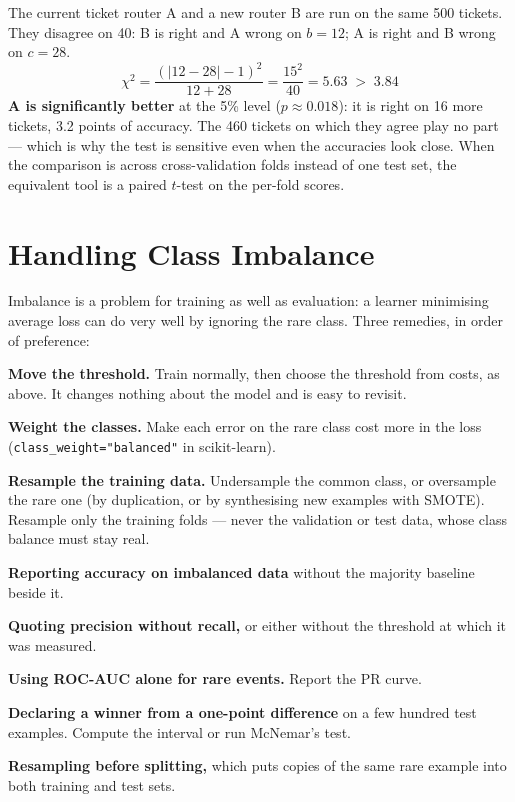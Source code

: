 \begin{worked}
The current ticket router A and a new router B are run on the same 500 tickets.
They disagree on 40: B is right and A wrong on $b = 12$; A is right and B wrong on
$c = 28$.
\[
\chi^2 = \frac{(|12 - 28| - 1)^2}{12 + 28} = \frac{15^2}{40} = 5.63 \;>\; 3.84
\]
\textbf{A is significantly better} at the 5\% level ($p \approx 0.018$): it is right on
16 more tickets, 3.2 points of accuracy. The 460 tickets on which they agree play
no part --- which is why the test is sensitive even when the accuracies look
close. When the comparison is across cross-validation folds instead of one test
set, the equivalent tool is a paired $t$-test on the per-fold scores.
\end{worked}

\section{Handling Class Imbalance}

Imbalance is a problem for training as well as evaluation: a learner minimising
average loss can do very well by ignoring the rare class. Three remedies, in
order of preference:
\begin{tightnum}
  \item \textbf{Move the threshold.} Train normally, then choose the threshold from
        costs, as above. It changes nothing about the model and is easy to
        revisit.
  \item \textbf{Weight the classes.} Make each error on the rare class cost more in
        the loss (\texttt{class\_weight="balanced"} in scikit-learn).
  \item \textbf{Resample the training data.} Undersample the common class, or
        oversample the rare one (by duplication, or by synthesising new examples
        with SMOTE). Resample only the training folds --- never the validation or
        test data, whose class balance must stay real.
\end{tightnum}

\begin{pitfall}
\begin{tight}
  \item \textbf{Reporting accuracy on imbalanced data} without the majority
        baseline beside it.
  \item \textbf{Quoting precision without recall,} or either without the
        threshold at which it was measured.
  \item \textbf{Using ROC-AUC alone for rare events.} Report the PR curve.
  \item \textbf{Declaring a winner from a one-point difference} on a few hundred
        test examples. Compute the interval or run McNemar's test.
  \item \textbf{Resampling before splitting,} which puts copies of the same rare
        example into both training and test sets.
\end{tight}
\end{pitfall}

